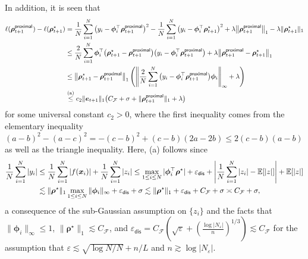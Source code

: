 \documentclass[english]{article}
\begin{document}
In addition, it is seen that
%
\begin{align}
\ell({\bm \rho}_{t+1}^{\mathsf{proximal}}) - \ell({\bm \rho}_{t+1}^{\star}) 
&= \frac1N\sum_{i=1}^N\big(y_i - {\bm \phi}_i^{\top}{\bm \rho}_{t+1}^{\mathsf{proximal}}\big)^2 - \frac1N\sum_{i=1}^N\big(y_i - {\bm \phi}_i^{\top}{\bm \rho}_{t+1}^{\star}\big)^2 + \lambda\big\|{\bm \rho}_{t+1}^{\mathsf{proximal}}\big\|_1 - \lambda\|{\bm \rho}_{t+1}^{\star}\|_1\notag\\
&\le \frac2N\sum_{i=1}^N{\bm \phi}_i^{\top}\big({\bm \rho}_{t+1}^{\star} - {\bm \rho}_{t+1}^{\mathsf{proximal}}\big)\big(y_i - {\bm \phi}_i^{\top}{\bm \rho}_{t+1}^{\mathsf{proximal}}\big) + \lambda\big\|{\bm \rho}_{t+1}^{\mathsf{proximal}} - {\bm \rho}_{t+1}^{\star}\big\|_1\notag\\
&\le \big\|{\bm \rho}_{t+1}^{\star} - {\bm \rho}_{t+1}^{\mathsf{proximal}}\big\|_1\left(\left\|\frac2N\sum_{i=1}^N\big(y_i - {\bm \phi}_i^{\top}{\bm \rho}_{t+1}^{\mathsf{proximal}}\big){\bm \phi}_i\right\|_{\infty} + \lambda\right)\notag\\
&\overset{\text{(a)}}{\le} c_2\|{\bm e}_{t+1}\|_1 \big(C_{\mathcal{F}} + \sigma + \|{\bm \rho}_{t+1}^{\mathsf{proximal}}\|_1 + \lambda
\big) 
\label{eq:UB-l-rho-tplus1-tstar}
\end{align}
%
for some universal constant $c_2>0$, where the first inequality comes from the elementary inequality $(a-b)^{2}-(a-c)^{2}=-(c-b)^{2}+(c-b)(2a-2b)\leq 2(c-b)(a-b)$ as well as the triangle inequality. Here, (a) follows since
%
\begin{align*}
\frac1N\sum_{i=1}^N|y_i|&\le \frac1N\sum_{i=1}^N|f({\bm x}_i)| + \frac1N\sum_{i=1}^N|z_i|
\le \max_{1\le i\le N}|{\bm \phi}_i^{\top}{\bm \rho}^{\star}| + \varepsilon_{\mathsf{dis}} + \left|\frac1N\sum_{i=1}^N|z_i| - \mathbb{E}[|z|]\right| + \mathbb{E}[|z|] \notag\\
& \lesssim  \|\bm{\rho}^{\star}\|_1 \max_{1\leq i\leq N} \|\bm{\phi}_i\|_{\infty} + \varepsilon_{\mathsf{dis}} + \sigma 
\lesssim \|\bm{\rho}^{\star}\|_1 + \varepsilon_{\mathsf{dis}} 
 + C_{\mathcal{F}} + \sigma 
\asymp C_{\mathcal{F}} + \sigma ,
\end{align*}
%
a consequence of the sub-Gaussian assumption on $\{z_i\}$ and the facts that $\|\bm{\phi}_i\|_{\infty}\leq 1$, $\|\bm{\rho}^{\star}\|_1\lesssim C_{\mathcal{F}}$, and $\varepsilon_{\mathsf{dis}} = C_{\mathcal{F}}\left( \sqrt{\varepsilon} + (\frac{\log|N_\varepsilon|}{n})^{1/3}\right) \lesssim C_{\mathcal{F}}$ for the assumption that $\varepsilon\lesssim \sqrt{\log N/N} + n/L $ and $n\gtrsim \log|N_{\varepsilon}|$.  
\end{document}
